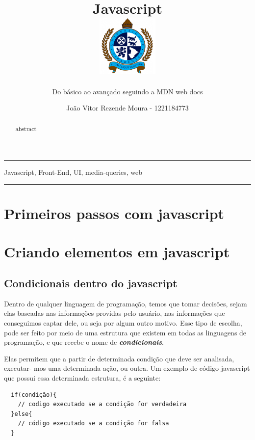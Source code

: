 \documentclass[12pt, a4paper]{paper}
\title{Javascript \\
  \hfill\includegraphics[height=3cm]{../images/universidade.png}
  \vspace{-3cm}
}
\subtitle{Do básico ao avançado seguindo a MDN web docs}
\author{João Vitor Rezende Moura - 1221184773}
\begin{document}
\maketitle

\hrule
\begin{abstract}
  abstract
\end{abstract}
\vspace{-0.6cm} %
\begin{keywords}
  Javascript, Front-End, UI, media-queries, web
\end{keywords}
\hrule

\section{Primeiros passos com javascript} %
\label{sec:Primeiros passos com javascript}


\section{Criando elementos em javascript} %
\label{sec:Criando elementos em javascript}

\subsection{Condicionais dentro do javascript} %
\label{sub:Condicionais dentro do javascript}
Dentro de qualquer linguagem de programação, temos que tomar decisões, 
sejam elas baseadas nas informações providas pelo usuário, nas informações 
que conseguimos captar dele, ou seja por algum outro motivo. Esse tipo de 
escolha, pode ser feito por meio de uma estrutura que existem em todas as 
linguagens de programação, e que recebe o nome de \textbf{\textit{condicionais}}.\par

Elas permitem que a partir de determinada condição que deve ser analisada,
executar-
mos uma determinada ação, ou outra. Um exemplo de código javascript 
que possui essa determinada estrutura, é a seguinte:

\begin{verbatim}
  if(condição){
    // codigo executado se a condição for verdadeira
  }else{
    // código executado se a condição for falsa
  }
\end{verbatim}
\end{document}
